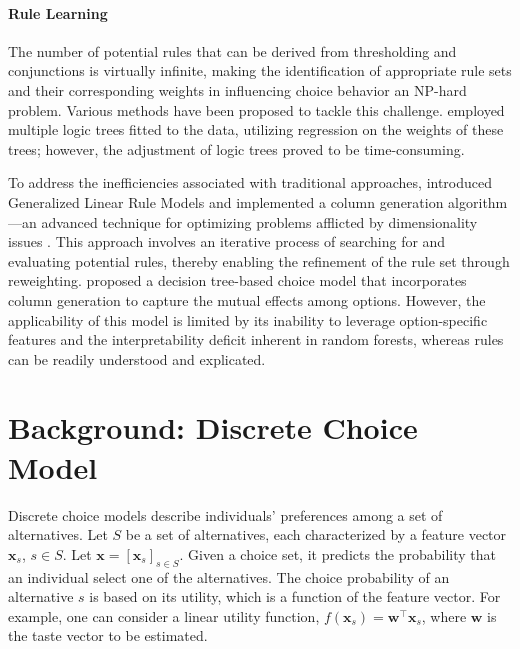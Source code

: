 \documentclass{article} %
\begin{document}
%

%
%
%
%
%
%
%
%
%
%
%
%
%
%
\paragraph{Rule Learning}
The number of potential rules that can be derived from thresholding and conjunctions is virtually infinite, making the identification of appropriate rule sets and their corresponding weights in influencing choice behavior an NP-hard problem. Various methods have been proposed to tackle this challenge. \citet{ruczinski2003logic} employed multiple logic trees fitted to the data, utilizing regression on the weights of these trees; however, the adjustment of logic trees proved to be time-consuming.

To address the inefficiencies associated with traditional approaches, \citet{wei2019generalized} introduced Generalized Linear Rule Models and implemented a column generation algorithm—an advanced technique for optimizing problems afflicted by dimensionality issues \citep{desaulniers2006column}. This approach involves an iterative process of searching for and evaluating potential rules, thereby enabling the refinement of the rule set through reweighting. \citet{chen2022decision} proposed a decision tree-based choice model that incorporates column generation to capture the mutual effects among options. However, the applicability of this model is limited by its inability to leverage option-specific features and the interpretability deficit inherent in random forests, whereas rules can be readily understood and explicated.
%
%
%
%
%


%
%
%
%
%
%


\section{Background: Discrete Choice Model}
\label{sec:background}

%

Discrete choice models describe individuals' preferences among a set of alternatives. Let $S$ be a set of alternatives, each characterized by a feature vector $\boldsymbol{x}_s$, $s \in S$. Let $\boldsymbol{x}=[\boldsymbol{x}_s]_{s\in S}$. Given a choice set, it predicts the probability that an individual select one of the alternatives. The choice probability of an alternative $s$ is based on its utility, which is a function of the feature vector. For example, one can consider a linear utility function, $f(\boldsymbol{x}_s)=\boldsymbol{w}^\top \boldsymbol{x}_s$, where $\boldsymbol{w}$ is the taste vector to be estimated. 
\end{document}
